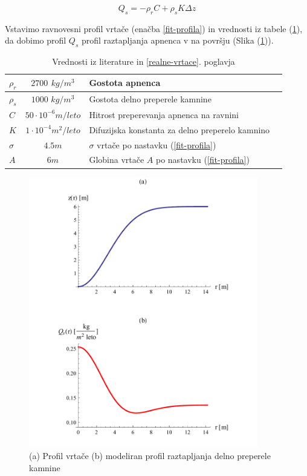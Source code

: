 \documentclass[a4paper, oneside, 12pt]{book}
\begin{document}
\begin{equation}
  Q_s = - \rho_r C + \rho_s K \Delta z
  \label{kontinuitetna-enacba-ravnovesje}
\end{equation}

Vstavimo ravnovesni profil vrtače (enačba \ref{fit-profila}) in vrednosti iz tabele (\ref{tab:tabela-konstant}), da dobimo profil $Q_s$ profil raztapljanja apnenca v na površju (Slika (\ref{fig:profil-raztapljanja})).

\begin{table}[h]
  \centering
  \begin{tabular}{| l | c | l | l |} \hline
    $\rho_r$ & $2700$ $kg/m^3$ & Gostota apnenca                                            \\ \hline
    $\rho_s$ & $1000$ $kg/m^3$ & Gostota delno preperele kamnine                            \\ \hline
    $C$      & $50 \cdot 10^{-6} m/leto$  & Hitrost preperevanja apnenca na ravnini         \\ \hline
    $K$      & $1 \cdot 10^{-4} m^2/leto$ & Difuzijska konstanta za delno preperelo kamnino \\ \hline
    $\sigma$ & $4.5m$ & $\sigma$ vrtače po nastavku (\ref{fit-profila})                     \\ \hline
    $A$      & $6m$ & Globina vrtače $A$ po nastavku (\ref{fit-profila})                    \\ \hline
  \end{tabular}
  \caption{Vrednosti iz literature \cite{Gams1967} \cite{ford2007karst} \cite{fleurant2008modelling} in \ref{realne-vrtace}. poglavja}
  \label{tab:tabela-konstant}
\end{table}

\begin{figure}[H]
  \begin{center}
    \includegraphics[width=10cm]{slike/profil-raztapljanja}
  \end{center}
  \caption{(a) Profil vrtače (b) modeliran profil raztapljanja delno preperele kamnine}
  \label{fig:profil-raztapljanja}
\end{figure}
\end{document}
